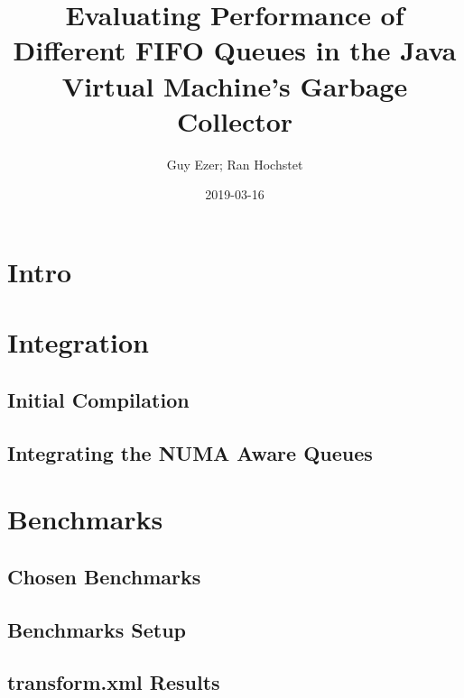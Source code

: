 \documentclass{article}
\title{Evaluating Performance of Different FIFO Queues in the Java Virtual Machine's Garbage Collector}
\date{2019-03-16}
\author{Guy Ezer; Ran Hochstet}
\begin{document}
  \maketitle
  \newpage
  \section{Intro}
  \section{Integration}
  \subsection{Initial Compilation}
  \subsection{Integrating the NUMA Aware Queues}
  \section{Benchmarks}
  \subsection{Chosen Benchmarks}
  \subsection{Benchmarks Setup}
  \subsection{transform.xml Results}
\end{document}
